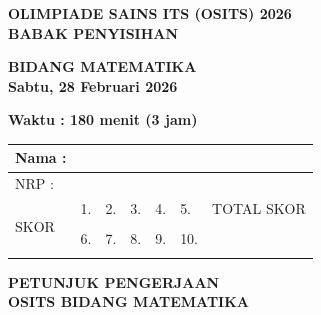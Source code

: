\documentclass[12pt,a4paper]{article}
\begin{document}
\thispagestyle{empty}

\begin{center}
  {\Large \textbf{OLIMPIADE SAINS ITS (OSITS) 2026}}\\[0.2cm]
  {\Large \textbf{BABAK PENYISIHAN}}
\end{center}

\vfill

\begin{center}
  {\Large \textbf{BIDANG MATEMATIKA}}\\[0.2cm]
  {\Large \textbf{Sabtu, 28 Februari 2026}}
\end{center}

\vfill

\begin{center}
  {\Large \textbf{Waktu : 180 menit (3 jam)}}
\end{center}

\vfill
\vfill

\noindent
\begin{tabular}{|p{2.2cm}|p{1.4cm}|p{1.4cm}|p{1.4cm}|p{1.4cm}|p{1.4cm}|p{3.5cm}|}
  \hline
  \rule[-0.2cm]{0pt}{0.7cm}Nama :   & \multicolumn{6}{l|}{}                                                             \\
  \hline
  \rule[-0.2cm]{0pt}{0.7cm}NRP :    & \multicolumn{6}{l|}{}                                                             \\
  \hline
  \multirow{4}{*}{\vspace{1cm}SKOR} & \rule{0pt}{0.4cm}1.   & 2. & 3. & 4. & 5.  & \centering\arraybackslash TOTAL SKOR \\ \cline{7-7}
                                    & \rule{0pt}{0.7cm}     &    &    &    &     & \multirow{3}{*}{}                    \\ \cline{2-6}
                                    & \rule{0pt}{0.4cm}6.   & 7. & 8. & 9. & 10. &                                      \\
                                    & \rule{0pt}{0.8cm}     &    &    &    &     &                                      \\
  \hline
\end{tabular}

\newpage

\thispagestyle{empty}
\begin{center}
  \textbf{PETUNJUK PENGERJAAN}\\
  \textbf{OSITS BIDANG MATEMATIKA}
\end{center}
\end{document}
